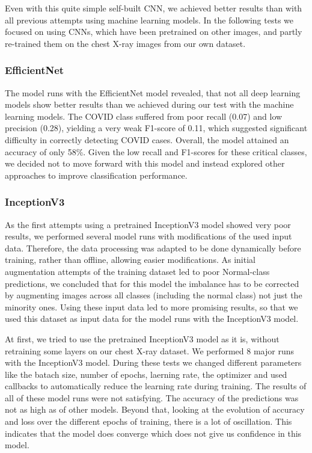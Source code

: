 \documentclass{article}
\begin{document}
Even with this quite simple self-built CNN, we achieved better results than with all previous attempts using machine learning models. In the following tests we focused on using CNNs, which have been pretrained on other images, and partly re-trained them on the chest X-ray images from our own dataset.


\subsubsection{EfficientNet} 
The model runs with the EfficientNet model revealed, that not all deep learning models show better results than we achieved during our test with the machine learning models. 
The COVID class suffered from poor recall (0.07) and low precision (0.28), yielding a very weak F1-score of 0.11, which suggested significant difficulty in correctly detecting COVID cases. Overall, the model attained an accuracy of only 58\%. Given the low recall and F1-scores for these critical classes, we decided not to move forward with this model and instead explored other approaches to improve classification performance.


\subsubsection{InceptionV3} \label{section:InceptionV3}

As the first attempts using a pretrained InceptionV3 model showed very poor results, we performed several model runs with modifications of the used input data. Therefore, the data processing was adapted to be done dynamically before training, rather than offline, allowing easier modifications. As initial augmentation attempts of the training dataset led to poor Normal-class predictions, we concluded that for this model the imbalance has to be corrected by augmenting images across all classes (including the normal class) not just the minority ones. Using these input data led to more promising results, so that we used this dataset as input data for the model runs with the InceptionV3 model. 

At first, we tried to use the pretrained InceptionV3 model as it is, without retraining some layers on our chest X-ray dataset. We performed 8 major runs with the InceptionV3 model. During these tests we changed different parameters like the batach size, number of epochs, laerning rate, the optimizer and used callbacks to automatically reduce the learning rate during training. The results of all of these model runs were not satisfying. The accuracy of the predictions was not as high as of other models. Beyond that, looking at the evolution of accuracy and loss over the different epochs of training, there is a lot of oscillation. This indicates that the model does converge which does not give us confidence in this model. 
\end{document}
